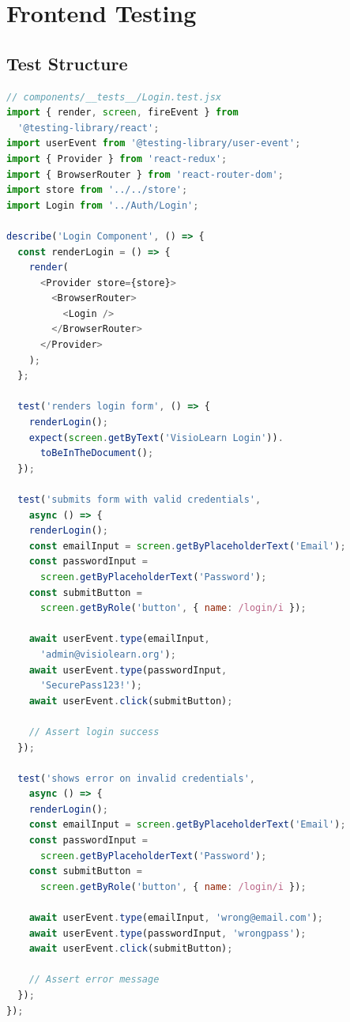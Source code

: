 \documentclass[12pt,a4paper,oneside]{article}
\begin{document}
\section{Frontend Testing}

\subsection{Test Structure}

\begin{lstlisting}[language=javascript]
// components/__tests__/Login.test.jsx
import { render, screen, fireEvent } from 
  '@testing-library/react';
import userEvent from '@testing-library/user-event';
import { Provider } from 'react-redux';
import { BrowserRouter } from 'react-router-dom';
import store from '../../store';
import Login from '../Auth/Login';

describe('Login Component', () => {
  const renderLogin = () => {
    render(
      <Provider store={store}>
        <BrowserRouter>
          <Login />
        </BrowserRouter>
      </Provider>
    );
  };

  test('renders login form', () => {
    renderLogin();
    expect(screen.getByText('VisioLearn Login')). 
      toBeInTheDocument();
  });

  test('submits form with valid credentials', 
    async () => {
    renderLogin();
    const emailInput = screen.getByPlaceholderText('Email');
    const passwordInput = 
      screen.getByPlaceholderText('Password');
    const submitButton = 
      screen.getByRole('button', { name: /login/i });

    await userEvent.type(emailInput, 
      'admin@visiolearn.org');
    await userEvent.type(passwordInput, 
      'SecurePass123!');
    await userEvent.click(submitButton);

    // Assert login success
  });

  test('shows error on invalid credentials', 
    async () => {
    renderLogin();
    const emailInput = screen.getByPlaceholderText('Email');
    const passwordInput = 
      screen.getByPlaceholderText('Password');
    const submitButton = 
      screen.getByRole('button', { name: /login/i });

    await userEvent.type(emailInput, 'wrong@email.com');
    await userEvent.type(passwordInput, 'wrongpass');
    await userEvent.click(submitButton);

    // Assert error message
  });
});
\end{lstlisting}
\end{document}
